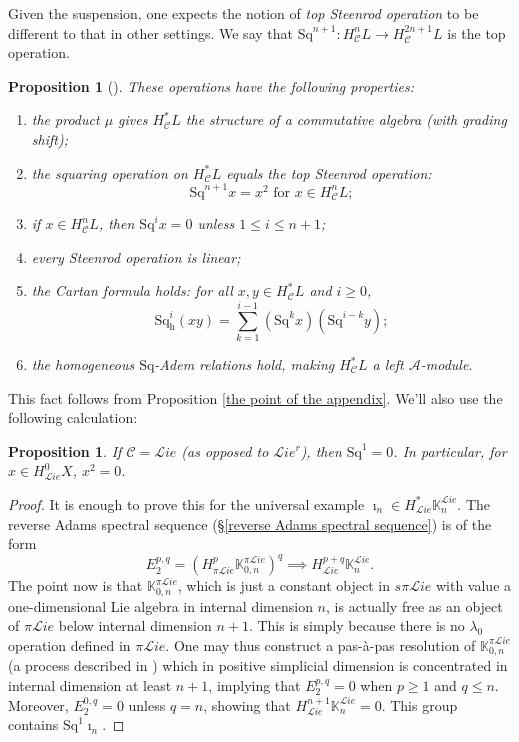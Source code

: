 \documentclass[11pt]{amsart} \renewcommand{\baselinestretch}{1.4}
\theoremstyle{plain}
\newtheorem{prop}[thm]{Proposition}
\theoremstyle{definition}
\renewcommand{\to}{\longrightarrow}
\newcommand{\scrL}{\mathscr{L}}
\newcommand{\calA}{\mathcal{A}}
\newcommand{\calc}{\mathcal{C}}
\newcommand{\citeBOX}[2][]{\cite[\mbox{#1}]{#2}}
\newcommand{\PA}[1]{\pi#1}
\newcommand{\Sq}{\mathrm{Sq}}
\newcommand{\LieSteen}{\calA}
\newcommand{\liealgs}{{\scrL\!\textit{ie}}}
\newcommand{\restliealgs}{{\scrL\!\textit{ie}^\textit{r}}}
\newcommand{\dhor}{_\mathrm{h}}
\newcommand{\Sqh}{\mathrm{Sq}\dhor}
\begin{document}
\begin{Constructing cohomology operations}
Given the suspension, one expects the notion of \emph{top Steenrod operation} to be different to that in other settings. We say that $\Sq^{n+1}:H^n_\calc L\to H^{2n+1}_\calc L$ is the top operation.
\begin{prop}[{\citeBOX[\S5.3]{PriddySimplicialLie.pdf}}]
\label{omnibus on coh of simp lie algs}These operations have the following properties:
\begin{enumerate}
\item the product $\mu$ gives $H^*_{\calc}L$ the structure of a commutative algebra (with grading shift);
\item the squaring operation on $H^*_{\calc}L$ equals the \emph{top Steenrod operation}:
\[\Sq^{n+1}x=x^{2}\text{\ \ for $x\in H^n_{\calc}L$};\]
\item \label{Sq unstable vanishing} if $x\in H^n_{\calc}L$, then $\Sq^ix=0$ unless $1\leq i\leq n+1$;
\item every Steenrod operation is linear;
\item the \emph{Cartan formula} holds:  for all $x,y\in   H^*_{\calc}L$ and $i\geq0$,
\[\Sqh^i(xy)=\textstyle\sum_{k=1}^{i-1}(\Sq^kx)(\Sq^{i-k}y);\]
\item \label{yeah H is a Stmodule} the  homogeneous $\Sq$-Adem relations hold, making $H^{*}_\calc L$ a left $\LieSteen$-module.
\end{enumerate}
\end{prop}
This fact follows from Proposition \ref{the point of the appendix}. We'll also use the following calculation:
\begin{prop}
\label{prop on sq1 on lie not rest}
If $\calc=\liealgs$ (as opposed to $\restliealgs$), then $\Sq^1=0$. In particular, for $x\in H^0_{\liealgs}X$, $x^2=0$.
\end{prop}
\begin{proof}
It is enough to prove this for the universal example $\imath_n\in H^*_{\liealgs}\mathbb{K}_n^{\liealgs}$. The reverse Adams spectral sequence (\S\ref{reverse Adams spectral sequence}) is of the form
\[E_2^{p,q}=(H^{p}_{\PA{\liealgs}}\mathbb{K}_{0,n}^{\PA{\liealgs}})^{q}\implies H^{p+q}_{\liealgs}\mathbb{K}_n^{\liealgs}.\]
The point now is that $\mathbb{K}_{0,n}^{\PA{\liealgs}}$, which is just a constant object in $s\PA{\liealgs}$ with value a one-dimensional Lie algebra in internal dimension $n$, is actually free as an object of $\PA{\liealgs}$ below internal dimension $n+1$. This is simply because there is no $\lambda_0$ operation defined in $\PA{\liealgs}$. One may thus construct a pas-\`a-pas resolution of $\mathbb{K}_{0,n}^{\PA{\liealgs}}$ (a process described in \cite{Andre-StepByStep}) which in positive simplicial dimension is concentrated in internal dimension at least $n+1$, implying that $E_2^{p,q}=0$ when $p\geq1$ and $q\leq n$. Moreover, $E_2^{0,q}=0$ unless $q=n$, showing that $H^{n+1}_{\liealgs}\mathbb{K}_n^{\liealgs}=0$. This group contains $\Sq^1\imath_n$.

\end{proof}
\end{Constructing cohomology operations}
\end{document}
